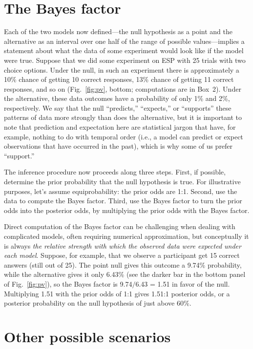 \section*{The Bayes factor}
Each of the two models now defined---the null hypothesis as a point and the alternative as an interval over one half of the range of possible values---implies a statement about what the data of some experiment would look like if the model were true.  Suppose that we did some experiment on ESP with 25 trials with two choice options.  Under the null, in such an experiment there is approximately a 10\% chance of getting 10 correct responses, 13\% chance of getting 11 correct responses, and so on (Fig.~\ref{fig:pv}, bottom; computations are in Box~2).  Under the alternative, these data outcomes have a probability of only 1\% and 2\%, respectively.  We say that the null ``predicts,'' ``expects,'' or ``supports'' these patterns of data more strongly than does the alternative, but it is important to note that prediction and expectation here are statistical jargon that have, for example, nothing to do with temporal order (i.e., a model can predict or expect observations that have occurred in the past), which is why some of us prefer ``support.''

The inference procedure now proceeds along three steps. First, if possible, determine the prior probability that the null hypothesis is true. For illustrative purposes, let's assume equiprobability: the prior odds are 1:1. Second, use the data to compute the Bayes factor. Third, use the Bayes factor to turn the prior odds into the posterior odds, by multiplying the prior odds with the Bayes factor.

Direct computation of the Bayes factor can be challenging when dealing with complicated models, often requiring numerical approximation, but conceptually it is always \emph{the relative strength with which the observed data were expected under each model}. Suppose, for example, that we observe a participant get 15 correct answers (still out of 25). The point null gives this outcome a 9.74\% probability, while the alternative gives it only 6.43\% (see the darker bar in the bottom panel of Fig.~\ref{fig:pv}), so the Bayes factor is 9.74$/$6.43 = 1.51 in favor of the null. Multiplying 1.51 with the prior odds of 1:1 gives 1.51:1 posterior odds, or a posterior probability on the null hypothesis of just above 60\%.

\section*{Other possible scenarios}

